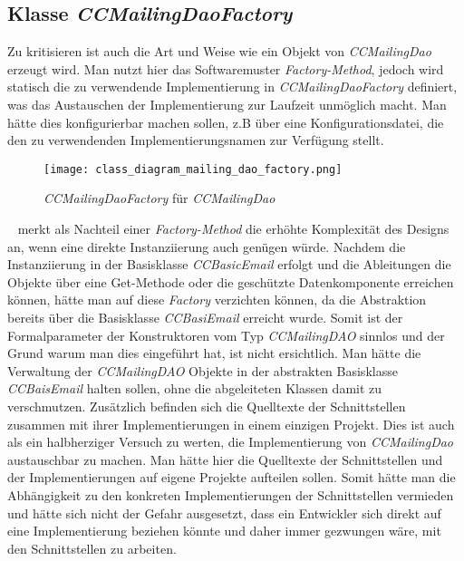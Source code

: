 \subsection{Klasse \emph{CCMailingDaoFactory}}
Zu kritisieren ist auch die Art und Weise wie ein Objekt von \emph{CCMailingDao} erzeugt wird. Man nutzt hier das Softwaremuster \emph{Factory-Method}, jedoch wird statisch die zu verwendende Implementierung in \emph{CCMailingDaoFactory} definiert, was das Austauschen der Implementierung zur Laufzeit unmöglich macht. Man hätte dies konfigurierbar machen sollen, z.B über eine Konfigurationsdatei, die den zu verwendenden Implementierungsnamen zur Verfügung stellt.
\begin{figure}[h]
\centering
\texttt{[image: class\_diagram\_mailing\_dao\_factory.png]} 
\caption{\emph{CCMailingDaoFactory} für \emph{CCMailingDao}}
\label{fig:klassen-hierarchie-ccmailingfactory}
\end{figure}
\ \newline 
\cite[72]{refactoreToPatterns} merkt als Nachteil einer \emph{Factory-Method} die erhöhte Komplexität des Designs an, wenn eine direkte Instanziierung auch genügen würde. Nachdem die Instanziierung in der Basisklasse \emph{CCBasicEmail} erfolgt und die Ableitungen die Objekte über eine Get-Methode oder die geschützte Datenkomponente erreichen können, hätte man auf diese \emph{Factory} verzichten können, da die Abstraktion bereits über die Basisklasse \emph{CCBasiEmail} erreicht wurde. Somit ist der Formalparameter der Konstruktoren vom Typ \emph{CCMailingDAO} sinnlos und der Grund warum man dies eingeführt hat, ist nicht ersichtlich. Man hätte die Verwaltung der \emph{CCMailingDAO} Objekte in der abstrakten Basisklasse \emph{CCBaisEmail} halten sollen, ohne die abgeleiteten Klassen damit zu verschmutzen. 
\newline 
\newline
Zusätzlich befinden sich die Quelltexte der Schnittstellen zusammen mit ihrer Implementierungen in einem einzigen Projekt. Dies ist auch als ein halbherziger Versuch zu werten, die Implementierung von \emph{CCMailingDao} austauschbar zu machen. Man hätte hier die Quelltexte der Schnittstellen und der Implementierungen auf eigene Projekte aufteilen sollen. Somit hätte man die Abhängigkeit zu den konkreten Implementierungen der Schnittstellen vermieden und hätte sich nicht der Gefahr ausgesetzt, dass ein Entwickler sich direkt auf eine Implementierung beziehen könnte und daher immer gezwungen wäre, mit den Schnittstellen zu arbeiten.

